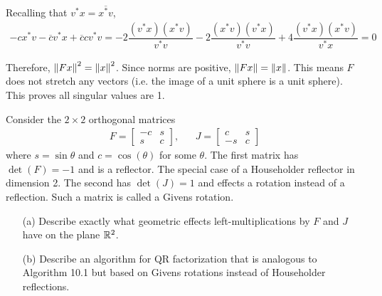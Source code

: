 \documentclass[10pt]{article}
\begin{document}
\begin{solution}[Solution]
\begin{enumerate}
        Recalling that \( v^*x=\overline{x^*v} \),
        \begin{align*}
            -cx^*v-\overline{c}v^*x+\overline{c}cv^*v = -2 \dfrac{(v^*x)(x^*v)}{v^*v}-2 \dfrac{(x^*v)(v^*x)}{v^*v}+4 \dfrac{(v^*x)(x^*v)}{v^*x} = 0
        \end{align*}

        Therefore, \( \left\lVert Fx\right\rVert^2=\left\lVert x\right\rVert^2 \). Since norms are positive, \( \left\lVert Fx\right\rVert=\left\lVert x\right\rVert \). This means \( F \) does not stretch any vectors (i.e. the image of a unit sphere is a unit sphere). This proves all singular values are 1.      

\end{enumerate}

\end{solution}


\begin{problem}[Exercise 10.4]
Consider the \( 2\times 2 \) orthogonal matrices
\begin{align*}
    F=\left[\begin{array}{cc}-c & s \\ s & c\end{array}\right], && J=\left[\begin{array}{cc}c & s \\ -s & c\end{array}\right]
\end{align*}
where \( s=\sin\theta \) and \( c=\cos(\theta) \) for some \( \theta \). The first matrix has \( \det(F)=-1 \) and is a reflector. The special case of a Householder reflector in dimension 2. The second has \( \det(J)=1 \) and effects a rotation instead of a reflection. Such a matrix is called a Givens rotation.
\begin{enumerate}
    \item[(a)] Describe exactly what geometric effects left-multiplications by \( F \) and \( J \) have on the plane \( \mathbb{R}^2 \).
    \item[(b)] Describe an algorithm for QR factorization that is analogous to Algorithm 10.1 but based on Givens rotations instead of Householder reflections.
\end{enumerate}
\end{problem}
\end{document}

